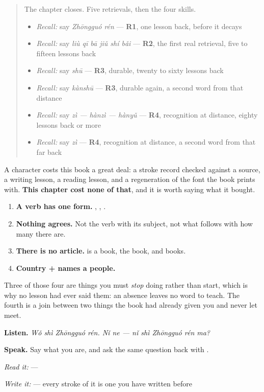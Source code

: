 \label{lesson:ZH-C22-practice}



\begin{quote}
The chapter closes. Five retrievals, then the four skills.

\begin{itemize}
\raggedright
  \item \emph{Recall:} say \emph{Zhōngguó rén} — \textbf{R1}, one lesson back, before it decays
  \item \emph{Recall:} say \emph{liù qī bā jiǔ shí bǎi} — \textbf{R2}, the first real retrieval, five to fifteen lessons back
  \item \emph{Recall:} say \emph{shū} — \textbf{R3}, durable, twenty to sixty lessons back
  \item \emph{Recall:} say \emph{kànshū} — \textbf{R3}, durable again, a second word from that distance
  \item \emph{Recall:} say \emph{zì — hànzì — hànyǔ} — \textbf{R4}, recognition at distance, eighty lessons back or more
  \item \emph{Recall:} say \emph{zì} — \textbf{R4}, recognition at distance, a second word from that far back
\end{itemize}
\end{quote}

\begin{grammarlens}[title={What you've built — four facts, no new strokes}]
A character costs this book a great deal: a stroke record checked against a source, a writing lesson, a reading lesson, and a regeneration of the font the book prints with. \textbf{This chapter cost none of that}, and it is worth saying what it bought.

\begin{enumerate}
\raggedright
  \item \textbf{A verb has one form.} , , .
  \item \textbf{Nothing agrees.} Not the verb with its subject, not what follows  with how many there are.
  \item \textbf{There is no article.}  is a book, the book, and books.
  \item \textbf{Country +  names a people.} 
\end{enumerate}

Three of those four are things you must \emph{stop} doing rather than start, which is why no lesson had ever said them: an absence leaves no word to teach. The fourth is a join between two things the book had already given you and never let meet.

\textbf{Listen.} \emph{Wǒ shì Zhōngguó rén. Nǐ ne — nǐ shì Zhōngguó rén ma?}

\textbf{Speak.} Say what you are, and ask the same question back with .

\emph{Read it:}  — 

\emph{Write it:}  — every stroke of it is one you have written before
\end{grammarlens}

